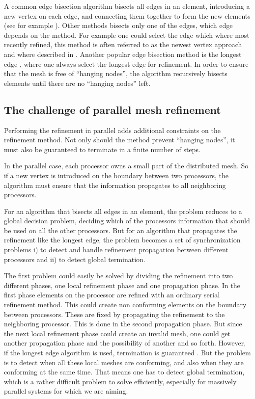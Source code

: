 A common edge bisection algorithm bisects all edges in an element,
introducing a new vertex on each edge, and connecting them together to
form the new elements (see for example \cite{Bey1995}). Other methods
bisects only one of the edges, which edge depends on the method. For
example one could select the edge which where most recently refined,
this method is often referred to as the newest vertex approach and
where described in \cite{Bansch1991}. Another popular edge bisection
method is the longest edge \cite{Rivara1984}, where one always select
the longest edge for refinement. In order to ensure that the mesh is
free of ``hanging nodes'', the algorithm recursively bisects elements
until there are no ``hanging nodes'' left.

\subsection{The challenge of parallel mesh refinement}

Performing the refinement in parallel adds additional constraints on
the refinement method. Not only should the method prevent ``hanging
nodes'', it must also be guaranteed to terminate in a finite number of
steps.



In the parallel case, each processor owns a small part of the
distributed mesh. So if a new vertex is introduced on the boundary
between two processors, the algorithm must ensure that the information
propagates to all neighboring processors.

For an algorithm that bisects all edges in an element, the problem
reduces to a global decision problem, deciding which of the processors
information that should be used on all the other processors. But for
an algorithm that propagates the refinement like the longest edge, the
problem becomes a set of synchronization problems i) to detect and handle
refinement propagation between different processors and ii) to detect
global termination.

The first problem could easily be solved by dividing the refinement
into two different phases, one local refinement phase and one
propagation phase. In the first phase elements on the processor are
refined with an ordinary serial refinement method. This could create
non conforming elements on the boundary between processors. These are
fixed by propagating the refinement to the neighboring processor. This
is done in the second propagation phase. But since the next local
refinement phase could create an invalid mesh, one could get another
propagation phase and the possibility of another and so
forth. However, if the longest edge algorithm is used, termination is
guaranteed \cite{CastanosSavage1999}. But the problem is to detect
when all these local meshes are conforming, and also when they are
conforming at the same time. That means one has to detect global
termination, which is a rather difficult problem to solve efficiently,
especially for massively parallel systems for which we are aiming.

